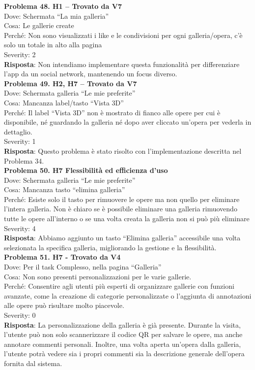 \documentclass{article}
\begin{document}
\noindent \textbf{Problema 48. H1 – Trovato da V7} \\
Dove: Schermata “La mia galleria” \\
Cosa: Le gallerie create \\
Perché: Non sono visualizzati i like e le condivisioni per ogni galleria/opera, c’è solo un totale in alto alla pagina \\
Severity: 2 \\
\textbf{Risposta}: Non intendiamo implementare questa funzionalità per differenziare l’app da un social network, mantenendo un focus diverso.\\

\noindent \textbf{Problema 49. H2, H7 – Trovato da V7} \\
Dove: Schermata galleria “Le mie preferite” \\
Cosa: Mancanza label/tasto “Vista 3D” \\
Perché: Il label “Vista 3D” non è mostrato di fianco alle opere per cui è disponibile, né guardando la galleria né dopo aver cliccato un’opera per vederla in dettaglio. \\
Severity: 1 \\
\textbf{Risposta}: Questo problema è stato risolto con l’implementazione descritta nel Problema 34.\\

\noindent \textbf{Problema 50. H7 Flessibilità ed efficienza d’uso} \\
Dove: Schermata galleria “Le mie preferite” \\
Cosa: Mancanza tasto “elimina galleria” \\
Perché: Esiste solo il tasto per rimuovere le opere ma non quello per eliminare l’intera galleria. Non è chiaro se è possibile eliminare una galleria rimuovendo tutte le opere all’interno o se una volta creata la galleria non si può più eliminare \\
Severity: 4 \\
\textbf{Risposta}: Abbiamo aggiunto un tasto “Elimina galleria” accessibile una volta selezionata la specifica galleria, migliorando la gestione e la flessibilità.\\

\noindent \textbf{Problema 51. H7 - Trovato da V4} \\
Dove: Per il task Complesso, nella pagina “Galleria” \\
Cosa: Non sono presenti personalizzazioni per le varie gallerie. \\
Perché: Consentire agli utenti più esperti di organizzare gallerie con funzioni avanzate, come la creazione di categorie personalizzate o l’aggiunta di annotazioni alle opere può risultare molto piacevole. \\
Severity: 0 \\
\textbf{Risposta}: La personalizzazione della galleria è già presente. Durante la visita, l’utente può non solo scannerizzare il codice QR per salvare le opere, ma anche annotare commenti personali. Inoltre, una volta aperta un’opera dalla galleria, l’utente potrà vedere sia i propri commenti sia la descrizione generale dell’opera fornita dal sistema.\\
\end{document}
